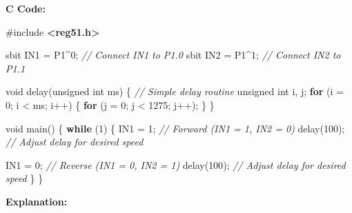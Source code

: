 \documentclass[
]{article}
\newenvironment{Shaded}{}{}
\newcommand{\CommentTok}[1]{\textcolor[rgb]{0.38,0.63,0.69}{\textit{#1}}}
\newcommand{\ControlFlowTok}[1]{\textcolor[rgb]{0.00,0.44,0.13}{\textbf{#1}}}
\newcommand{\DataTypeTok}[1]{\textcolor[rgb]{0.56,0.13,0.00}{#1}}
\newcommand{\DecValTok}[1]{\textcolor[rgb]{0.25,0.63,0.44}{#1}}
\newcommand{\ImportTok}[1]{\textcolor[rgb]{0.00,0.50,0.00}{\textbf{#1}}}
\newcommand{\NormalTok}[1]{#1}
\newcommand{\OperatorTok}[1]{\textcolor[rgb]{0.40,0.40,0.40}{#1}}
\newcommand{\PreprocessorTok}[1]{\textcolor[rgb]{0.74,0.48,0.00}{#1}}
\begin{document}
\textbf{C Code:}

\begin{Shaded}
\begin{Highlighting}[]
\PreprocessorTok{\#include }\ImportTok{\textless{}reg51.h\textgreater{}}

\NormalTok{sbit IN1 }\OperatorTok{=}\NormalTok{ P1}\OperatorTok{\^{}}\DecValTok{0}\OperatorTok{;}  \CommentTok{// Connect IN1 to P1.0}
\NormalTok{sbit IN2 }\OperatorTok{=}\NormalTok{ P1}\OperatorTok{\^{}}\DecValTok{1}\OperatorTok{;}  \CommentTok{// Connect IN2 to P1.1}

\DataTypeTok{void}\NormalTok{ delay}\OperatorTok{(}\DataTypeTok{unsigned} \DataTypeTok{int}\NormalTok{ ms}\OperatorTok{)} \OperatorTok{\{} \CommentTok{// Simple delay routine}
    \DataTypeTok{unsigned} \DataTypeTok{int}\NormalTok{ i}\OperatorTok{,}\NormalTok{ j}\OperatorTok{;}
    \ControlFlowTok{for} \OperatorTok{(}\NormalTok{i }\OperatorTok{=} \DecValTok{0}\OperatorTok{;}\NormalTok{ i }\OperatorTok{\textless{}}\NormalTok{ ms}\OperatorTok{;}\NormalTok{ i}\OperatorTok{++)} \OperatorTok{\{}
        \ControlFlowTok{for} \OperatorTok{(}\NormalTok{j }\OperatorTok{=} \DecValTok{0}\OperatorTok{;}\NormalTok{ j }\OperatorTok{\textless{}} \DecValTok{1275}\OperatorTok{;}\NormalTok{ j}\OperatorTok{++);}
    \OperatorTok{\}}
\OperatorTok{\}}

\DataTypeTok{void}\NormalTok{ main}\OperatorTok{()} \OperatorTok{\{}
    \ControlFlowTok{while} \OperatorTok{(}\DecValTok{1}\OperatorTok{)} \OperatorTok{\{}
\NormalTok{        IN1 }\OperatorTok{=} \DecValTok{1}\OperatorTok{;}  \CommentTok{// Forward (IN1 = 1, IN2 = 0)}
\NormalTok{        delay}\OperatorTok{(}\DecValTok{100}\OperatorTok{);} \CommentTok{// Adjust delay for desired speed}

\NormalTok{        IN1 }\OperatorTok{=} \DecValTok{0}\OperatorTok{;}  \CommentTok{// Reverse (IN1 = 0, IN2 = 1)}
\NormalTok{        delay}\OperatorTok{(}\DecValTok{100}\OperatorTok{);} \CommentTok{// Adjust delay for desired speed}
    \OperatorTok{\}}
\OperatorTok{\}}
\end{Highlighting}
\end{Shaded}

\textbf{Explanation:}
\end{document}
